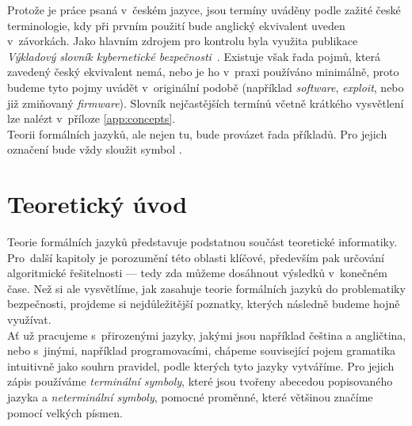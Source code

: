 Protože je práce psaná v~českém jazyce, jsou termíny uváděny podle zažité české terminologie, kdy při prvním použití bude anglický ekvivalent uveden 
v~závorkách. Jako hlavním zdrojem pro kontrolu byla využita publikace \textit{Výkladový slovník kybernetické bezpečnosti}~\cite{Slovnik2015}. 
Existuje však řada pojmů, která zavedený český ekvivalent nemá, nebo je ho v~praxi používáno minimálně, proto budeme tyto pojmy uvádět v~originální 
podobě (například \textit{software}, \textit{exploit}, nebo již zmiňovaný \textit{firmware}). Slovník nejčastějších termínů včetně krátkého
vysvětlení lze nalézt v~příloze \ref{app:concepts}. \\

Teorii formálních jazyků, ale nejen tu, bude provázet řada příkladů. Pro jejich označení bude vždy sloužit symbol \Bat.

\chapter{Teoretický úvod} \label{ch:theory}
Teorie formálních jazyků představuje podstatnou součást teoretické informatiky. Pro~další kapitoly je porozumění této oblasti klíčové, především pak 
určování algoritmické řešitelnosti --- tedy zda můžeme dosáhnout výsledků v~konečném čase. Než si ale vysvětlíme, jak zasahuje teorie formálních 
jazyků do problematiky bezpečnosti, projdeme si nejdůležitější poznatky, kterých následně budeme hojně využívat. \\

Ať už pracujeme s~přirozenými jazyky, jakými jsou například čeština a angličtina, nebo s~jinými, například programovacími, chápeme související pojem 
gramatika intuitivně jako souhrn pravidel, podle kterých tyto jazyky vytváříme. Pro jejich zápis používáme \textit{terminální symboly}, které jsou 
tvořeny abecedou popisovaného jazyka a \textit{neterminální symboly}, pomocné proměnné, které většinou značíme pomocí velkých písmen. \\

